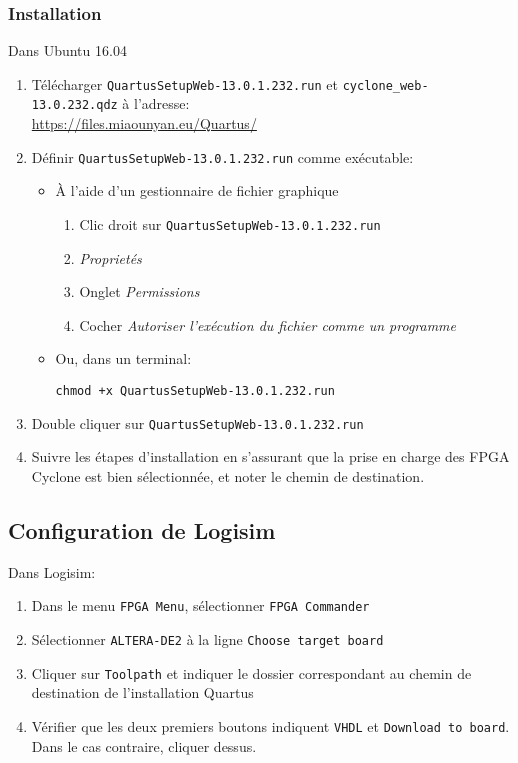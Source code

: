 \documentclass{article}
\begin{document}
    \subsubsection{Installation}
    \noindent Dans Ubuntu 16.04
    \begin{enumerate}
        \item Télécharger \texttt{QuartusSetupWeb-13.0.1.232.run} et \texttt{cyclone\_web-13.0.232.qdz} à l'adresse: \\
        \url{https://files.miaounyan.eu/Quartus/}
        \item Définir \texttt{QuartusSetupWeb-13.0.1.232.run} comme exécutable:
        \begin{itemize}
            \item À l'aide d'un gestionnaire de fichier graphique
            \begin{enumerate}
                \item Clic droit sur \texttt{QuartusSetupWeb-13.0.1.232.run}
                \item \textit{Proprietés}
                \item Onglet \textit{Permissions}
                \item Cocher \textit{Autoriser l'exécution du fichier comme un programme}
            \end{enumerate}
            \vspace{0.2em}
            \item Ou, dans un terminal:
            \begin{lstlisting}
chmod +x QuartusSetupWeb-13.0.1.232.run
            \end{lstlisting}
        \end{itemize}
        \item Double cliquer sur \texttt{QuartusSetupWeb-13.0.1.232.run}
        \item Suivre les étapes d'installation en s'assurant que la prise en charge des FPGA Cyclone est bien sélectionnée, et noter le chemin de destination.
    \end{enumerate}

    \subsection{Configuration de Logisim}
    \noindent Dans Logisim:
    \begin{enumerate}
        \item Dans le menu \texttt{FPGA Menu}, sélectionner \texttt{FPGA Commander}
        \item Sélectionner \texttt{ALTERA-DE2} à la ligne \texttt{Choose target board}
        \item Cliquer sur \texttt{Toolpath} et indiquer le dossier correspondant au chemin de destination de l'installation Quartus
        \item Vérifier que les deux premiers boutons indiquent \texttt{VHDL} et \texttt{Download to board}.
        Dans le cas contraire, cliquer dessus.
    \end{enumerate}
\end{document}
